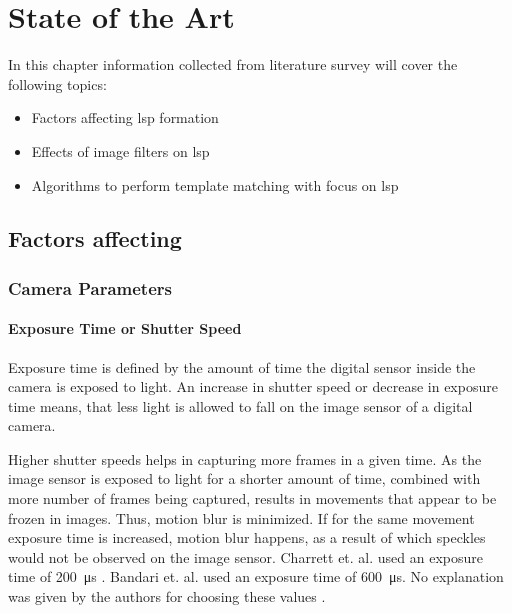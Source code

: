 \chapter{State of the Art}\label{chapter:sota}
In this chapter information collected from literature survey will cover the following topics:

\begin{itemize}
    \item Factors affecting \gls{lsp} formation
    \item Effects of image filters on \gls{lsp}
    \item Algorithms to perform template matching with focus on \gls{lsp}
\end{itemize}

\section{Factors affecting }

\subsection{Camera Parameters}

    \subsubsection*{Exposure Time or Shutter Speed}\label{Subsubsection:Exposure_Time}
    Exposure time is defined by the amount of time the digital sensor inside the camera is exposed to light. An increase in shutter speed or decrease in exposure time means, that less light is allowed to fall on the image sensor of a digital camera.

    \vspace{5mm}
    \noindent Higher shutter speeds helps in capturing more frames in a given time. As the image sensor is exposed to light for a shorter amount of time, combined with more number of frames being captured, results in movements that appear to be frozen in images. Thus, motion blur is minimized. If for the same movement exposure time is increased, motion blur happens, as a result of which speckles would not be observed on the image sensor. Charrett et. al.  used an exposure time of \SI{200}{\micro\second} \cite{charrett_2018}. Bandari et. al. used an exposure time of \SI{600}{\micro\second}. No explanation was given by the authors for choosing these values \cite{bandari}.

    \vspace{5mm}

